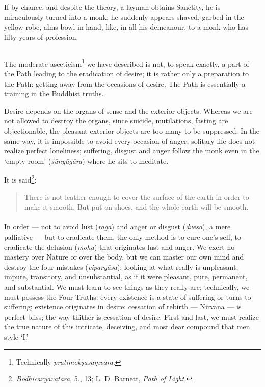 \documentclass[a4paper, 11pt, oneside, english]{article}
\begin{document}
If by chance, and despite the theory, a layman obtains Sanctity, he is miraculously turned into a monk; he suddenly appears shaved, garbed in the yellow robe, alms bowl in hand, like, in all his demeanour, to a monk who has fifty years of profession.

\subsection{}
\paragraph{}
The moderate asceticism\footnote{Technically \emph{prātimokṣasaṃvara}.} we have described is not, to speak exactly, a part of the Path leading to the eradication of desire; it is rather only a preparation to the Path: getting away from the occasions of desire. The Path is essentially a training in the Buddhist truths.

Desire depends on the organs of sense and the exterior objects. Whereas we are not allowed to destroy the organs, since suicide, mutilations, fasting are objectionable, the pleasant exterior objects are too many to be suppressed. In the same way, it is impossible to avoid every occasion of anger; solitary life does not realize perfect loneliness; suffering, disgust and anger follow the monk even in the `empty room' (\emph{śūnyāgāra}) where he sits to meditate.

It is said\footnote{\emph{Bodhicaryāvatāra}, 5., 13; L. D. Barnett, \emph{Path of Light}.}:
\begin{quotation}
\small
There is not leather enough to cover the surface of the earth in order to make it smooth. But put on shoes, and the whole earth will be smooth.
\end{quotation}
\paragraph{}
In order --- not to avoid lust (\emph{rāga}) and anger or disgust (\emph{dveṣa}), a mere palliative --- but to eradicate them, the only method is to cure one's self, to eradicate the delusion (\emph{moha}) that originates lust and anger. We exert no mastery over Nature or over the body, but we can master our own mind and destroy the four mistakes (\emph{viparyāsa}): looking at what really is unpleasant, impure, transitory, and unsubstantial, as if it were pleasant, pure, permanent, and substantial. We must learn to see things as they really are; technically, we must possess the Four Truths: every existence is a state of suffering or turns to suffering; existence originates in desire; cessation of rebirth --- Nirvāṇa --- is perfect bliss; the way thither is cessation of desire. First and last, we must realize the true nature of this intricate, deceiving, and most dear compound that men style `I.'
\end{document}
